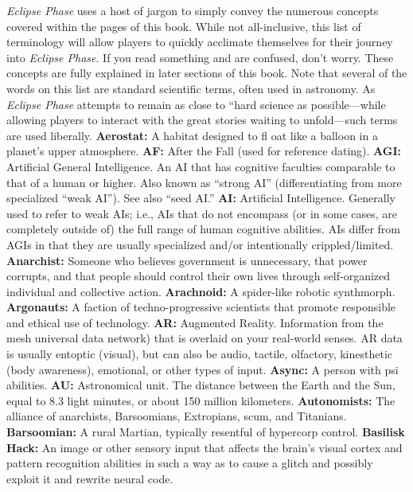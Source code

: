 \textit{Eclipse Phase} uses a host of jargon to simply convey 
the numerous concepts covered within the pages of 
this book. While not all-inclusive, this list of terminology
will allow players to quickly acclimate themselves
for their journey into \textit{Eclipse Phase}. If you read something
and are confused, don't worry. These concepts
are fully explained in later sections of this book.
Note that several of the words on this list are 
standard scientific terms, often used in astronomy. As 
\textit{Eclipse Phase} attempts to remain as close to ``hard science
as possible—while allowing players to interact
with the great stories waiting to unfold—such terms 
are used liberally.
\textbf{ Aerostat:} A habitat designed to ﬂ oat like a balloon in a 
planet's upper atmosphere.
\textbf{ AF:} After the Fall (used for reference dating).
\textbf{ AGI:} Artificial General Intelligence. An AI that has cognitive
faculties comparable to that of a human or higher.
Also known as ``strong AI'' (differentiating from more 
specialized ``weak AI''). See also ``seed AI.''
\textbf{ AI:} Artificial Intelligence. Generally used to refer to weak 
AIs; i.e., AIs that do not encompass (or in some cases, are 
completely outside of) the full range of human cognitive 
abilities. AIs differ from AGIs in that they are usually 
specialized and/or intentionally crippled/limited.
\textbf{ Anarchist:} Someone who believes government is 
unnecessary, that power corrupts, and that people should 
control their own lives through self-organized individual 
and collective action.
\textbf{ Arachnoid:} A spider-like robotic synthmorph.
\textbf{ Argonauts:} A faction of techno-progressive scientists 
that promote responsible and ethical use of technology.
\textbf{ AR:} Augmented Reality. Information from the mesh universal
data network) that is overlaid on your real-world
senses. AR data is usually entoptic (visual), but can also 
be audio, tactile, olfactory, kinesthetic (body awareness), 
emotional, or other types of input.
\textbf{ Async:} A person with psi abilities.
\textbf{ AU:} Astronomical unit. The distance between the Earth 
and the Sun, equal to 8.3 light minutes, or about 150 
million kilometers. 
\textbf{ Autonomists:} The alliance of anarchists, Barsoomians, 
Extropians, scum, and Titanians.
\textbf{ Barsoomian:} A rural Martian, typically resentful of 
hypercorp control.
\textbf{ Basilisk Hack:} An image or other sensory input that 
affects the brain's visual cortex and pattern recognition 
abilities in such a way as to cause a glitch and possibly 
exploit it and rewrite neural code.
